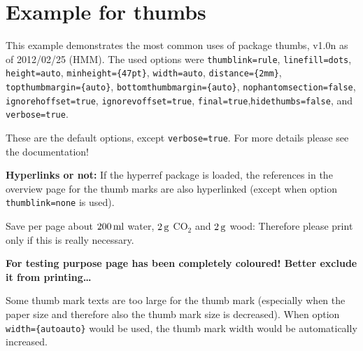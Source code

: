 \documentclass[twoside,british]{article}[2007/10/19]%
\gdef\unit#1{\mathord{\thinspace\mathrm{#1}}}
\begin{document}
\section*{Example for thumbs}

This example demonstrates the most common uses of package
\textsf{thumbs}, v1.0n as of 2012/02/25 (HMM).
The used options were \texttt{thumblink=rule}, \texttt{linefill=dots},
\texttt{height=auto}, \texttt{minheight=\{47pt\}}, \texttt{width={auto}},
\texttt{distance=\{2mm\}}, \newline
\texttt{topthumbmargin=\{auto\}}, \texttt{bottomthumbmargin=\{auto\}}, \newline
\texttt{nophantomsection=false},
\texttt{ignorehoffset=true}, \texttt{ignorevoffset=true}, \newline
\texttt{final=true},\texttt{hidethumbs=false}, and \texttt{verbose=true}.

\noindent These are the default options, except \texttt{verbose=true}.
For more details please see the documentation!\newline

\textbf{Hyperlinks or not:} If the \textsf{hyperref} package is loaded,
the references in the overview page for the thumb marks are also hyperlinked
(except when option \texttt{thumblink=none} is used).\newline

\bigskip

{\color{teal} Save per page about $200\unit{ml}$ water, $2\unit{g}$ CO$_{2}$
and $2\unit{g}$ wood:\newline
Therefore please print only if this is really necessary.}\newline

\bigskip

\textbf{%
For testing purpose page \pageref{greenpage} has been completely coloured!
\newline
Better exclude it from printing\ldots \newline}

\bigskip

Some thumb mark texts are too large for the thumb mark (especially when the
paper size and therefore also the thumb mark size is decreased).
When option \texttt{width=\{autoauto\}} would be used,
the thumb mark width would be automatically increased.

\bigskip
\end{document}
